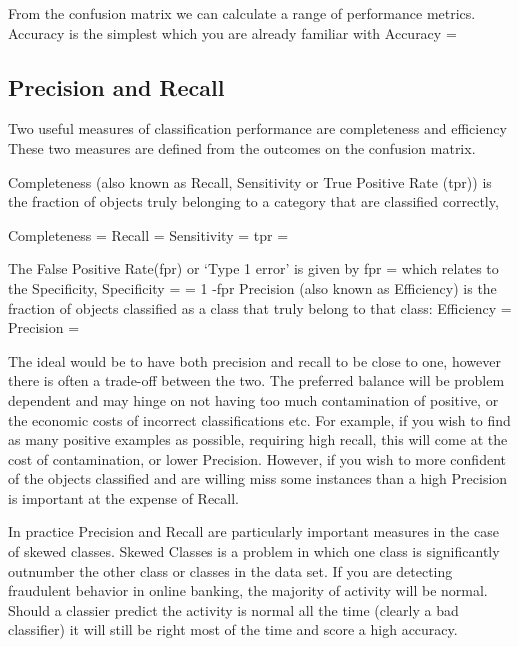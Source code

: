 From the confusion matrix we can calculate a range of performance metrics. 
Accuracy is the simplest which you are already familiar with
\be
Accuracy = 
\ee

	\subsection{Precision and Recall}
        
        
        
Two useful measures of classification performance are completeness and efficiency\citep{flach2012machine}
These two measures are defined from the outcomes on the confusion matrix\citep{ball2010data}.

Completeness (also known as Recall, Sensitivity or True Positive Rate (tpr)) is the fraction of objects truly belonging to a category that are classified correctly,

\be
Completeness = Recall = Sensitivity = tpr =  
\ee

The False Positive Rate(fpr) or `Type 1 error' is given by
\be
fpr = 
\ee
which relates to the Specificity,
\be
Specificity =  = 1 -fpr 
\ee
Precision (also known as Efficiency) is the fraction of objects classified as a class that truly belong to that class:
\be
Efficiency = Precision =  
\ee

The ideal would be to have both precision and recall to be close to one, however there is often a trade-off between the two.
The preferred balance will be problem dependent and may hinge on not having too much contamination of positive, or the economic costs of incorrect classifications etc.
For example, if you wish to find as many positive examples as possible, requiring high recall, this will come at the cost of contamination, or lower Precision.
However, if you wish to more confident of the objects classified and are willing miss some instances than a high Precision is important at the expense of Recall.

In practice Precision and Recall are particularly important measures in the case of skewed classes.
Skewed Classes is a problem in which one class is significantly outnumber the other class or classes in the data set.
If you are detecting fraudulent behavior in online banking, the majority of activity will be normal.
Should a classier predict the activity is normal all the time (clearly a bad classifier) it will still be right most of the time and score a high accuracy.

